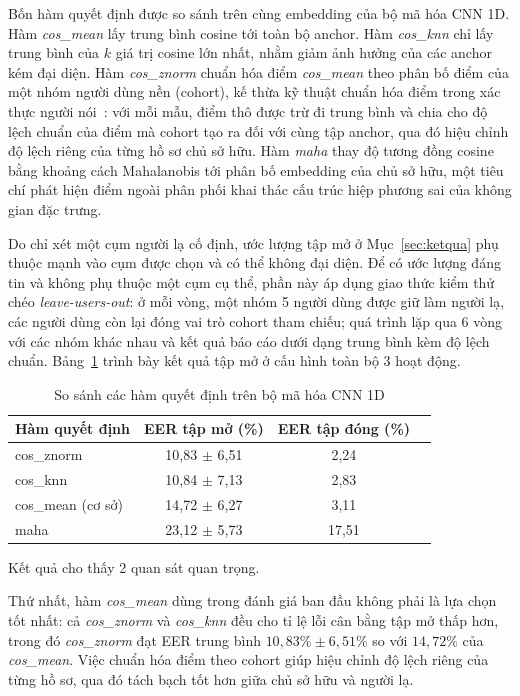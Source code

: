 \documentclass[../DoAn.tex]{subfiles}
\begin{document}
Bốn hàm quyết định được so sánh trên cùng embedding của bộ mã hóa CNN 1D. Hàm \textit{cos\_mean} lấy trung bình cosine tới toàn bộ anchor. Hàm \textit{cos\_knn} chỉ lấy trung bình của $k$ giá trị cosine lớn nhất, nhằm giảm ảnh hưởng của các anchor kém đại diện. Hàm \textit{cos\_znorm} chuẩn hóa điểm \textit{cos\_mean} theo phân bố điểm của một nhóm người dùng nền (cohort), kế thừa kỹ thuật chuẩn hóa điểm trong xác thực người nói~\cite{auckenthaler2000score}: với mỗi mẫu, điểm thô được trừ đi trung bình và chia cho độ lệch chuẩn của điểm mà cohort tạo ra đối với cùng tập anchor, qua đó hiệu chỉnh độ lệch riêng của từng hồ sơ chủ sở hữu. Hàm \textit{maha} thay độ tương đồng cosine bằng khoảng cách Mahalanobis tới phân bố embedding của chủ sở hữu, một tiêu chí phát hiện điểm ngoài phân phối khai thác cấu trúc hiệp phương sai của không gian đặc trưng.

Do chỉ xét một cụm người lạ cố định, ước lượng tập mở ở Mục~\ref{sec:ketqua} phụ thuộc mạnh vào cụm được chọn và có thể không đại diện. Để có ước lượng đáng tin và không phụ thuộc một cụm cụ thể, phần này áp dụng giao thức kiểm thử chéo \textit{leave-users-out}: ở mỗi vòng, một nhóm 5 người dùng được giữ làm người lạ, các người dùng còn lại đóng vai trò cohort tham chiếu; quá trình lặp qua 6 vòng với các nhóm khác nhau và kết quả báo cáo dưới dạng trung bình kèm độ lệch chuẩn. Bảng~\ref{tab:scorer_open} trình bày kết quả tập mở ở cấu hình toàn bộ 3 hoạt động.

\begin{table}[H]
    \centering
    \caption{So sánh các hàm quyết định trên bộ mã hóa CNN 1D}
    \label{tab:scorer_open}
    \begin{tabular}{|l|c|c|c|}
    \hline
    \textbf{Hàm quyết định} & \textbf{EER tập mở (\%)} & \textbf{EER tập đóng (\%)} \\
    \hline
    cos\_znorm & 10,83 $\pm$ 6,51 & 2,24 \\
    cos\_knn   & 10,84 $\pm$ 7,13 & 2,83 \\
    cos\_mean (cơ sở) & 14,72 $\pm$ 6,27 & 3,11 \\
    maha       & 23,12 $\pm$ 5,73 & 17,51 \\
    \hline
    \end{tabular}
\end{table}

Kết quả cho thấy 2 quan sát quan trọng.

Thứ nhất, hàm \textit{cos\_mean} dùng trong đánh giá ban đầu không phải là lựa chọn tốt nhất: cả \textit{cos\_znorm} và \textit{cos\_knn} đều cho tỉ lệ lỗi cân bằng tập mở thấp hơn, trong đó \textit{cos\_znorm} đạt EER trung bình $10,83\% \pm 6,51\%$ so với $14,72\%$ của \textit{cos\_mean}. Việc chuẩn hóa điểm theo cohort giúp hiệu chỉnh độ lệch riêng của từng hồ sơ, qua đó tách bạch tốt hơn giữa chủ sở hữu và người lạ.
\end{document}

